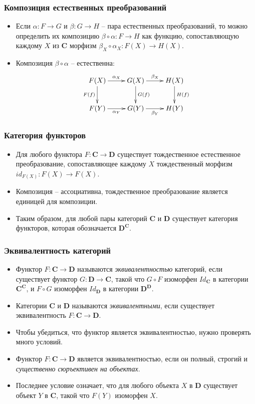 \documentclass{beamer}
\theoremstyle{definition}
\newcommand{\cat}[1]{\mathbf{#1}}
\renewcommand{\C}{\cat{C}}
\newcommand{\D}{\cat{D}}
\begin{document}
\begin{frame}
\frametitle{Композиция естественных преобразований}
\begin{itemize}
\item Если $\alpha : F \to G$ и $\beta : G \to H$ -- пара естественных преобразований, то можно определить их композицию $\beta \circ \alpha : F \to H$ как функцию, сопоставляющую каждому $X$ из $\C$ морфизм $\beta_X \circ \alpha_X : F(X) \to H(X)$.
\item Композиция $\beta \circ \alpha$ -- естественна:
\[ \xymatrix{ F(X) \ar[r]^{\alpha_X} \ar[d]_{F(f)} & G(X) \ar[d]^{G(f)} \ar[r]^{\beta_X} & H(X) \ar[d]^{H(f)} \\
              F(Y) \ar[r]_{\alpha_Y}               & G(Y) \ar[r]_{\beta_Y}               & H(Y)
            } \]
\end{itemize}
\end{frame}

\begin{frame}
\frametitle{Категория функторов}
\begin{itemize}
\item Для любого функтора $F : \C \to \D$ существует тождественное естественное преобразование, сопоставляющее каждому $X$ тождественный морфизм $id_{F(X)} : F(X) \to F(X)$.
\item Композиция -- ассоциативна, тождественное преобразование является единицей для композиции.
\item Таким образом, для любой пары категорий $\C$ и $\D$ существует категория функторов, которая обозначается $\D^\C$.
\end{itemize}
\end{frame}

\begin{frame}
\frametitle{Эквивалентность категорий}
\begin{itemize}
\item Функтор $F : \C \to \D$ называются \emph{эквивалентностью} категорий, если существует функтор $G : \D \to \C$, такой что $G \circ F$ изоморфен $Id_\C$ в категории $\C^\C$, и $F \circ G$ изоморфен $Id_\D$ в категории $\D^\D$.
\item Категории $\C$ и $\D$ называются \emph{эквивалентными}, если существует эквивалентность $F : \C \to \D$.
\item Чтобы убедиться, что функтор является эквивалентностью, нужно проверять много условий.
\item Функтор $F : \C \to \D$ является эквивалентностью, если он полный, строгий и \emph{существенно сюръективен на объектах}.
\item Последнее условие означает, что для любого объекта $X$ в $\D$ существует объект $Y$ в $\C$, такой что $F(Y)$ изоморфен $X$.
\end{itemize}
\end{frame}
\end{document}
